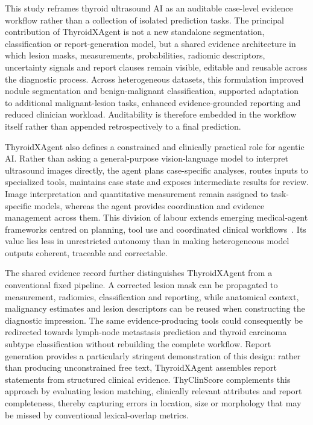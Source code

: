 \documentclass[fleqn,10pt]{wlscirep}
\begin{document}
This study reframes thyroid ultrasound AI as an auditable case-level evidence workflow rather than a collection of isolated prediction tasks. The principal contribution of ThyroidXAgent is not a new standalone segmentation, classification or report-generation model, but a shared evidence architecture in which lesion masks, measurements, probabilities, radiomic descriptors, uncertainty signals and report clauses remain visible, editable and reusable across the diagnostic process. Across heterogeneous datasets, this formulation improved nodule segmentation and benign-malignant classification, supported adaptation to additional malignant-lesion tasks, enhanced evidence-grounded reporting and reduced clinician workload. Auditability is therefore embedded in the workflow itself rather than appended retrospectively to a final prediction.

ThyroidXAgent also defines a constrained and clinically practical role for agentic AI. Rather than asking a general-purpose vision-language model to interpret ultrasound images directly, the agent plans case-specific analyses, routes inputs to specialized tools, maintains case state and exposes intermediate results for review. Image interpretation and quantitative measurement remain assigned to task-specific models, whereas the agent provides coordination and evidence management across them. This division of labour extends emerging medical-agent frameworks centred on planning, tool use and coordinated clinical workflows~\cite{Qiu2024NatMachIntellAgenticSystems,Zou2025LancetAgenticTeammates,Moritz2025NatBMECoordinatedAgents}. Its value lies less in unrestricted autonomy than in making heterogeneous model outputs coherent, traceable and correctable.

The shared evidence record further distinguishes ThyroidXAgent from a conventional fixed pipeline. A corrected lesion mask can be propagated to measurement, radiomics, classification and reporting, while anatomical context, malignancy estimates and lesion descriptors can be reused when constructing the diagnostic impression. The same evidence-producing tools could consequently be redirected towards lymph-node metastasis prediction and thyroid carcinoma subtype classification without rebuilding the complete workflow. Report generation provides a particularly stringent demonstration of this design: rather than producing unconstrained free text, ThyroidXAgent assembles report statements from structured clinical evidence. ThyClinScore complements this approach by evaluating lesion matching, clinically relevant attributes and report completeness, thereby capturing errors in location, size or morphology that may be missed by conventional lexical-overlap metrics.
\end{document}
